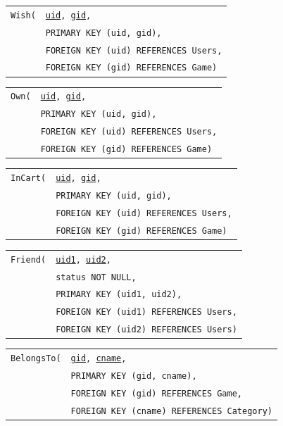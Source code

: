 \documentclass[12pt, oneside]{article}
\begin{document}
\begin{tabular}{l@{}l}
    \texttt{Wish(} & \texttt{\underline{uid}, \underline{gid},}\\
                    & \texttt{PRIMARY KEY (uid, gid),}\\
                    & \texttt{FOREIGN KEY (uid) REFERENCES Users,}\\
                    & \texttt{FOREIGN KEY (gid) REFERENCES Game)}
\end{tabular}

\begin{tabular}{l@{}l}
    \texttt{Own(} & \texttt{\underline{uid}, \underline{gid},}\\
                   & \texttt{PRIMARY KEY (uid, gid),}\\
                   & \texttt{FOREIGN KEY (uid) REFERENCES Users,}\\
                   & \texttt{FOREIGN KEY (gid) REFERENCES Game)}
\end{tabular}

\begin{tabular}{l@{}l}
    \texttt{InCart(} & \texttt{\underline{uid}, \underline{gid},}\\
                      & \texttt{PRIMARY KEY (uid, gid),}\\
                      & \texttt{FOREIGN KEY (uid) REFERENCES Users,}\\
                      & \texttt{FOREIGN KEY (gid) REFERENCES Game)}
\end{tabular}

\begin{tabular}{l@{}l}
    \texttt{Friend(} & \texttt{\underline{uid1}, \underline{uid2},}\\
                      & \texttt{status NOT NULL,}\\
                      & \texttt{PRIMARY KEY (uid1, uid2),}\\
                      & \texttt{FOREIGN KEY (uid1) REFERENCES Users,}\\
                      & \texttt{FOREIGN KEY (uid2) REFERENCES Users)}
\end{tabular}

\begin{tabular}{l@{}l}
    \texttt{BelongsTo(} & \texttt{\underline{gid}, \underline{cname},}\\
                          & \texttt{PRIMARY KEY (gid, cname),}\\
                          & \texttt{FOREIGN KEY (gid) REFERENCES Game,}\\
                          & \texttt{FOREIGN KEY (cname) REFERENCES Category)}
\end{tabular}
\end{document}

